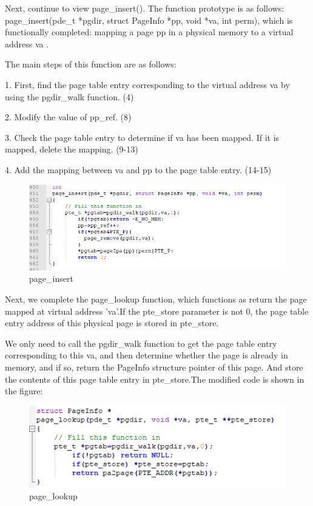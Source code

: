 Next, continue to view page\_insert(). The function prototype is as follows: page\_insert(pde\_t *pgdir, struct PageInfo *pp, void *va, int perm), which is functionally completed: mapping a page pp in a physical memory to a virtual address va .

The main steps of this function are as follows:

1. First, find the page table entry corresponding to the virtual address va by using the pgdir\_walk function. (4)

2. Modify the value of pp\_ref. (8)

3. Check the page table entry to determine if va has been mapped. If it is mapped, delete the mapping. (9-13)

4. Add the mapping between va and pp to the page table entry. (14-15)

\begin{figure}[H]
\centering
\includegraphics[width=0.8\linewidth]{figure/page_insert_changed}
\caption{page\_insert}
\end{figure}

Next, we complete the page\_lookup function, which functions as return the page mapped at virtual address 'va'.If the pte\_store parameter is not 0, the page table entry address of this physical page is stored in pte\_store.

We only need to call the pgdir\_walk function to get the page table entry corresponding to this va, and then determine whether the page is already in memory, and if so, return the PageInfo structure pointer of this page. And store the contents of this page table entry in pte\_store.The modified code is shown in the figure:
\begin{figure}[H]
\centering
\includegraphics[width=0.8\linewidth]{figure/page_lookup_changed}
\caption{page\_lookup}
\end{figure}

